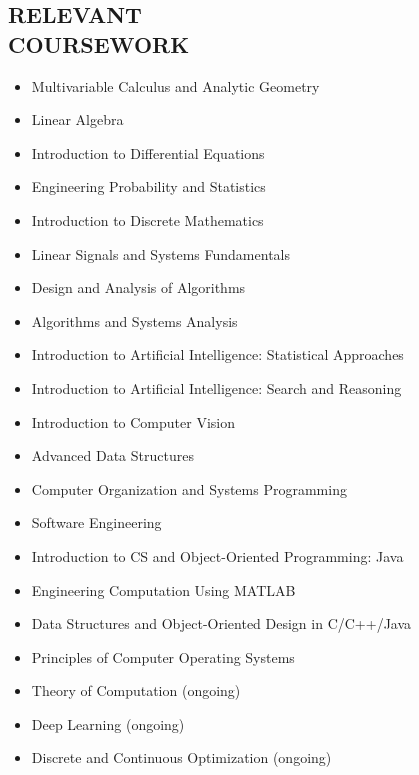 \documentclass[margin]{res}
\begin{document}
\begin{resume}
\section{RELEVANT\\COURSEWORK}
\small
\begin{multicols}{2}
    \begin{itemize}
        \item Multivariable Calculus and Analytic Geometry
        \item Linear Algebra
        \item Introduction to Differential Equations
        \item Engineering Probability and Statistics
        \item Introduction to Discrete Mathematics
        \item Linear Signals and Systems Fundamentals
        \item Design and Analysis of Algorithms
        \item Algorithms and Systems Analysis
        \item Introduction to Artificial Intelligence: Statistical Approaches
        \item Introduction to Artificial Intelligence: Search and Reasoning
        \item Introduction to Computer Vision
        \item Advanced Data Structures
        \item Computer Organization and Systems Programming
        \item Software Engineering
        \item Introduction to CS and Object-Oriented Programming: Java
        \item Engineering Computation Using MATLAB
        \item Data Structures and Object-Oriented Design in C/C++/Java
        \item Principles of Computer Operating Systems
        \item Theory of Computation (ongoing)
        \item Deep Learning (ongoing)
        \item Discrete and Continuous Optimization (ongoing)
    \end{itemize}
\end{multicols}
\normalsize
%


\end{resume}
\end{document}
